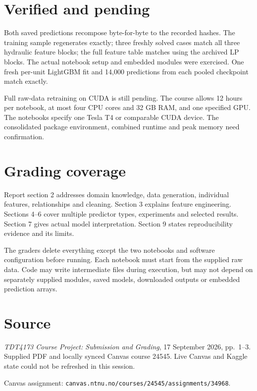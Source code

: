 \documentclass[a4paper,11pt]{article}
\begin{document}
\section{Verified and pending}
Both saved predictions recompose byte-for-byte to the recorded hashes. The training sample regenerates exactly; three freshly solved cases match all three hydraulic feature blocks; the full feature table matches using the archived LP blocks. The actual notebook setup and embedded modules were exercised. One fresh per-unit LightGBM fit and 14,000 predictions from each pooled checkpoint match exactly.

Full raw-data retraining on CUDA is still pending. The course allows 12 hours per notebook, at most four CPU cores and 32 GB RAM, and one specified GPU. The notebooks specify one Tesla T4 or comparable CUDA device. The consolidated package environment, combined runtime and peak memory need confirmation.

\section{Grading coverage}
Report section 2 addresses domain knowledge, data generation, individual features, relationships and cleaning. Section 3 explains feature engineering. Sections 4--6 cover multiple predictor types, experiments and selected results. Section 7 gives actual model interpretation. Section 9 states reproducibility evidence and its limits.

The graders delete everything except the two notebooks and software configuration before running. Each notebook must start from the supplied raw data. Code may write intermediate files during execution, but may not depend on separately supplied modules, saved models, downloaded outputs or embedded prediction arrays.

\section*{Source}
\emph{TDT4173 Course Project: Submission and Grading}, 17 September 2026, pp.~1--3. Supplied PDF and locally synced Canvas course 24545. Live Canvas and Kaggle state could not be refreshed in this session.

Canvas assignment: \texttt{canvas.ntnu.no/courses/24545/assignments/34968}.
\end{document}
